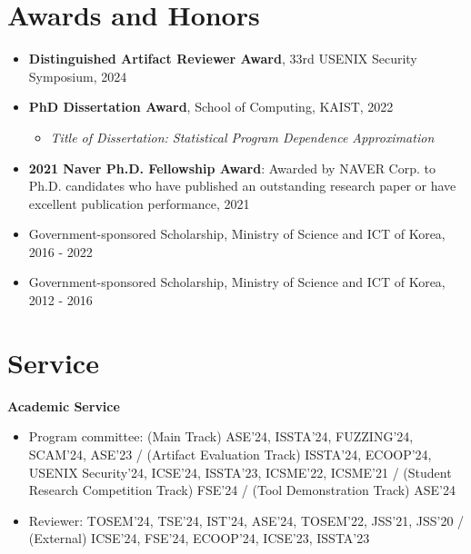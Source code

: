 \documentclass[letterpaper,11pt]{article}
\begin{document}
\section{Awards and Honors}
\begin{itemize}
  \item \textbf{Distinguished Artifact Reviewer Award}, 33rd USENIX Security Symposium, 2024
  \item \textbf{PhD Dissertation Award}, School of Computing, KAIST, 2022
        \vspace{-5pt}\begin{itemize}
          \item \emph{Title of Dissertation: Statistical Program Dependence Approximation}
        \end{itemize}
  \item \textbf{2021 Naver Ph.D. Fellowship Award}: Awarded by NAVER Corp. to Ph.D. candidates who have published an outstanding research paper or have excellent publication performance, 2021
  \item Government-sponsored Scholarship, Ministry of Science and ICT of Korea, 2016 - 2022
  \item Government-sponsored Scholarship, Ministry of Science and ICT of Korea, 2012 - 2016
\end{itemize}

\section{Service}
\textbf{Academic Service}\vspace{-4pt}
\begin{itemize}
  \item Program committee: (Main Track) ASE'24, ISSTA'24, FUZZING'24, SCAM'24, ASE'23 / (Artifact Evaluation Track) ISSTA'24, ECOOP'24, USENIX Security'24, ICSE'24, ISSTA'23, ICSME'22, ICSME'21 / (Student Research Competition Track) FSE'24 / (Tool Demonstration Track) ASE'24
  \item Reviewer: TOSEM'24, TSE'24, IST'24, ASE'24, TOSEM'22, JSS'21, JSS'20  / (External) ICSE'24, FSE'24, ECOOP'24, ICSE'23, ISSTA'23
\end{itemize}
\end{document}
